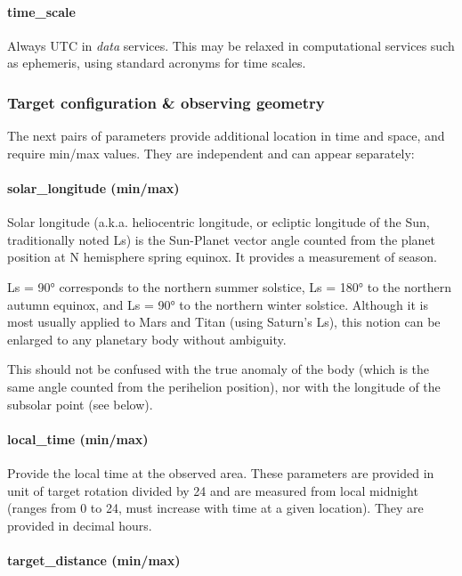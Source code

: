 \documentclass[11pt,a4paper]{ivoa}
\begin{document}
\paragraph{time\_scale}

Always UTC in \emph{data} services. This may be relaxed in computational services such as ephemeris, using standard acronyms for time scales.

\subsubsection{Target configuration \& observing geometry}

The next pairs of parameters provide additional location in time and space, and require min/max values. They are independent and can appear separately:

\paragraph{solar\_longitude (min/max)}

Solar longitude (a.k.a. heliocentric longitude, or ecliptic longitude of the Sun, traditionally noted Ls) is the Sun-Planet vector angle counted from the planet position at N hemisphere spring equinox. It provides a measurement of season.

Ls = 90° corresponds to the northern summer solstice, Ls = 180° to the northern autumn equinox, and Ls = 90° to the northern winter solstice. Although it is most usually applied to Mars and Titan (using Saturn's Ls), this notion can be enlarged to any planetary body without ambiguity.

This should not be confused with the true anomaly of the body (which is the same angle counted from the perihelion position), nor with the longitude of the subsolar point (see below).

\paragraph{local\_time (min/max)}

Provide the local time at the observed area. These parameters are provided in unit of target rotation divided by 24 and are measured from local midnight (ranges from 0 to 24, must increase with time at a given location). They are provided in decimal hours.

\paragraph{target\_distance (min/max)}
\end{document}
